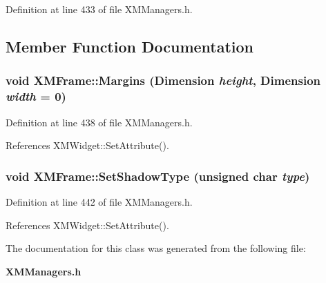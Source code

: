 Definition at line 433 of file XMManagers.h.

\subsection{Member Function Documentation}
\subsubsection{\setlength{\rightskip}{0pt plus 5cm}void XMFrame::Margins (Dimension {\em height}, Dimension {\em width} = 0)\hspace{0.3cm}{\tt  [inline]}}\label{classXMFrame_a5}




Definition at line 438 of file XMManagers.h.

References XMWidget::Set\-Attribute().
\subsubsection{\setlength{\rightskip}{0pt plus 5cm}void XMFrame::Set\-Shadow\-Type (unsigned char {\em type})\hspace{0.3cm}{\tt  [inline]}}\label{classXMFrame_a6}




Definition at line 442 of file XMManagers.h.

References XMWidget::Set\-Attribute().

The documentation for this class was generated from the following file:\begin{CompactItemize}
\item 
{\bf XMManagers.h}\end{CompactItemize}
